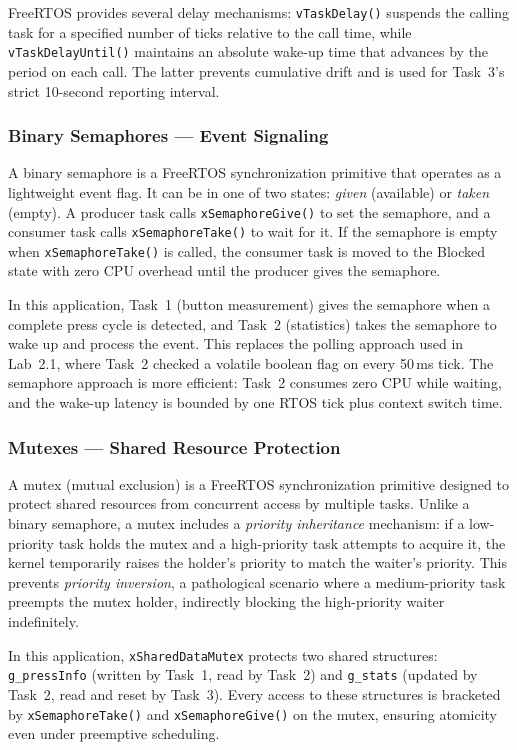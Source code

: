 FreeRTOS provides several delay mechanisms: \texttt{vTaskDelay()} suspends the calling task for a specified number of ticks relative to the call time, while \texttt{vTaskDelayUntil()} maintains an absolute wake-up time that advances by the period on each call. The latter prevents cumulative drift and is used for Task~3's strict 10-second reporting interval.

\subsubsection{Binary Semaphores --- Event Signaling}

A binary semaphore is a FreeRTOS synchronization primitive that operates as a lightweight event flag. It can be in one of two states: \emph{given} (available) or \emph{taken} (empty). A producer task calls \texttt{xSemaphoreGive()} to set the semaphore, and a consumer task calls \texttt{xSemaphoreTake()} to wait for it. If the semaphore is empty when \texttt{xSemaphoreTake()} is called, the consumer task is moved to the Blocked state with zero CPU overhead until the producer gives the semaphore.

In this application, Task~1 (button measurement) gives the semaphore when a complete press cycle is detected, and Task~2 (statistics) takes the semaphore to wake up and process the event. This replaces the polling approach used in Lab~2.1, where Task~2 checked a volatile boolean flag on every 50\,ms tick. The semaphore approach is more efficient: Task~2 consumes zero CPU while waiting, and the wake-up latency is bounded by one RTOS tick plus context switch time.

\subsubsection{Mutexes --- Shared Resource Protection}

A mutex (mutual exclusion) is a FreeRTOS synchronization primitive designed to protect shared resources from concurrent access by multiple tasks. Unlike a binary semaphore, a mutex includes a \emph{priority inheritance} mechanism: if a low-priority task holds the mutex and a high-priority task attempts to acquire it, the kernel temporarily raises the holder's priority to match the waiter's priority. This prevents \emph{priority inversion}, a pathological scenario where a medium-priority task preempts the mutex holder, indirectly blocking the high-priority waiter indefinitely.

In this application, \texttt{xSharedDataMutex} protects two shared structures: \texttt{g\_pressInfo} (written by Task~1, read by Task~2) and \texttt{g\_stats} (updated by Task~2, read and reset by Task~3). Every access to these structures is bracketed by \texttt{xSemaphoreTake()} and \texttt{xSemaphoreGive()} on the mutex, ensuring atomicity even under preemptive scheduling.

